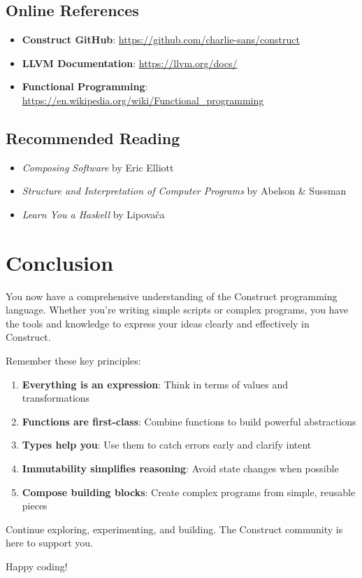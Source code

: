 \documentclass[11pt,twoside,openright]{book}
\begin{document}
\section{Online References}

\begin{itemize}
    \item \textbf{Construct GitHub}: \url{https://github.com/charlie-sans/construct}
    \item \textbf{LLVM Documentation}: \url{https://llvm.org/docs/}
    \item \textbf{Functional Programming}: \url{https://en.wikipedia.org/wiki/Functional_programming}
\end{itemize}

\section{Recommended Reading}

\begin{itemize}
    \item \textit{Composing Software} by Eric Elliott
    \item \textit{Structure and Interpretation of Computer Programs} by Abelson \& Sussman
    \item \textit{Learn You a Haskell} by Lipovača
\end{itemize}

\backmatter

\chapter*{Conclusion}

You now have a comprehensive understanding of the Construct programming language. Whether you're writing simple scripts or complex programs, you have the tools and knowledge to express your ideas clearly and effectively in Construct.

Remember these key principles:

\begin{enumerate}
    \item \textbf{Everything is an expression}: Think in terms of values and transformations
    \item \textbf{Functions are first-class}: Combine functions to build powerful abstractions
    \item \textbf{Types help you}: Use them to catch errors early and clarify intent
    \item \textbf{Immutability simplifies reasoning}: Avoid state changes when possible
    \item \textbf{Compose building blocks}: Create complex programs from simple, reusable pieces
\end{enumerate}

Continue exploring, experimenting, and building. The Construct community is here to support you.

Happy coding!
\end{document}
